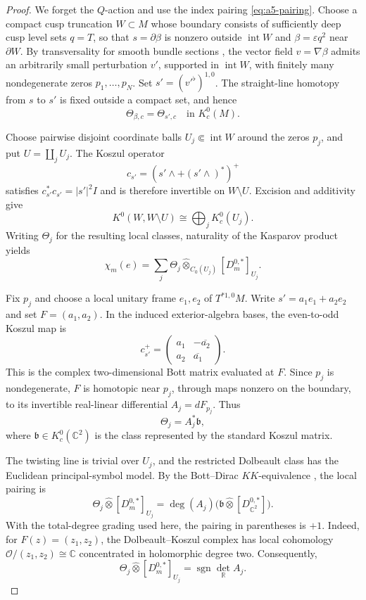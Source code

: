 \documentclass[11pt]{article}
\theoremstyle{definition}
\theoremstyle{plain}
\numberwithin{equation}{section}
\begin{document}
\begin{proof}
We forget the $Q$-action and use the index pairing
\eqref{eq:a5-pairing}. Choose a compact cusp
truncation $W\subset M$ whose boundary consists
of sufficiently deep cusp level sets $q=T$, so
that $s=\partial\beta$ is nonzero outside
$\operatorname{int}W$ and
$\beta=\varepsilon q^2$ near $\partial W$.
By transversality for smooth bundle sections
\cite[Theorem~3.10]{CohenIgaNorbury},
the vector field $v=\nabla\beta$ admits an
arbitrarily small perturbation $v'$, supported
in $\operatorname{int}W$, with finitely many
nondegenerate zeros $p_1,\ldots,p_N$.
Set $s'=(v'^\flat)^{1,0}$.
The straight-line homotopy from $s$ to $s'$
is fixed outside a compact set, and hence
\[
  \Theta_{\beta,c}=\Theta_{s',c}
  \quad\text{in }K_c^0(M).
\]

Choose pairwise disjoint coordinate balls
$U_j\Subset\operatorname{int}W$ around the
zeros $p_j$, and put $U=\coprod_jU_j$.
The Koszul operator
\[
  c_{s'}=(s'\wedge+(s'\wedge)^*)^+
\]
satisfies
$c_{s'}^*c_{s'}=|s'|^2I$ and is therefore
invertible on $W\setminus U$.
Excision and additivity give
\[
  K^0(W,W\setminus U)
  \cong\bigoplus_jK_c^0(U_j).
\]
Writing $\Theta_j$ for the resulting local
classes, naturality of the Kasparov product
yields
\begin{equation}\label{eq:identity-local-sum}
  \chi_m(e)=
  \sum_j\Theta_j\widehat\otimes_{C_0(U_j)}
  [D_m^{0,*}]_{U_j}.
\end{equation}

Fix $p_j$ and choose a local unitary frame
$e_1,e_2$ of $T^{*1,0}M$. Write
$s'=a_1e_1+a_2e_2$ and set $F=(a_1,a_2)$.
In the induced exterior-algebra bases,
the even-to-odd Koszul map is
\[
  c_{s'}^+=
  \begin{pmatrix}
    a_1&-\overline{a_2}\\
    a_2&\overline{a_1}
  \end{pmatrix}.
\]
This is the complex two-dimensional Bott
matrix evaluated at $F$.
Since $p_j$ is nondegenerate, $F$ is
homotopic near $p_j$, through maps nonzero
on the boundary, to its invertible
real-linear differential $A_j=dF_{p_j}$.
Thus
\[
  \Theta_j=A_j^*\mathfrak b,
\]
where $\mathfrak b\in K_c^0(\mathbb C^2)$
is the class represented by the standard
Koszul matrix.

The twisting line is trivial over $U_j$,
and the restricted Dolbeault class has the
Euclidean principal-symbol model.
By the Bott--Dirac $KK$-equivalence
\cite[Theorems~2.7 and~2.10]{KasparovIndex},
the local pairing is
\[
  \Theta_j\widehat\otimes[D_m^{0,*}]_{U_j}
  =\deg(A_j)
   \bigl(\mathfrak b\widehat\otimes
   [D_{\mathbb C^2}^{0,*}]\bigr).
\]
With the total-degree grading used here,
the pairing in parentheses is $+1$.
Indeed, for $F(z)=(z_1,z_2)$, the
Dolbeault--Koszul complex has local
cohomology $\mathcal O/(z_1,z_2)
\cong\mathbb C$ concentrated in
holomorphic degree two.
Consequently,
\[
  \Theta_j\widehat\otimes[D_m^{0,*}]_{U_j}
  =\operatorname{sgn}\det_{\mathbb R}A_j.
\]


\end{proof}
\end{document}
